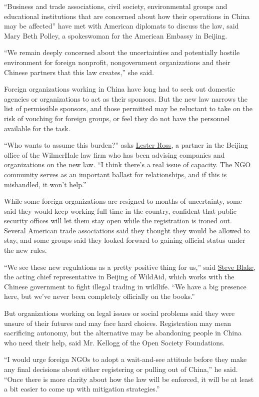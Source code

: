 ``Business and trade associations, civil society, environmental groups
and educational institutions that are concerned about how their
operations in China may be affected'' have met with American diplomats
to discuss the law, said Mary Beth Polley, a spokeswoman for the
American Embassy in Beijing.

``We remain deeply concerned about the uncertainties and potentially
hostile environment for foreign nonprofit, nongovernment organizations
and their Chinese partners that this law creates,'' she said.

Foreign organizations working in China have long had to seek out
domestic agencies or organizations to act as their sponsors. But the new
law narrows the list of permissible sponsors, and those permitted may be
reluctant to take on the risk of vouching for foreign groups, or feel
they do not have the personnel available for the task.

``Who wants to assume this burden?'' asks
\href{https://www.wilmerhale.com/lester_ross/}{Lester Ross}, a partner
in the Beijing office of the WilmerHale law firm who has been advising
companies and organizations on the new law. ``I think there's a real
issue of capacity. The NGO community serves as an important ballast for
relationships, and if this is mishandled, it won't help.''

While some foreign organizations are resigned to months of uncertainty,
some said they would keep working full time in the country, confident
that public security offices will let them stay open while the
registration is ironed out. Several American trade associations said
they thought they would be allowed to stay, and some groups said they
looked forward to gaining official status under the new rules.

``We see these new regulations as a pretty positive thing for us,'' said
\href{http://wildaid.org/people/steve-blake}{Steve Blake}, the acting
chief representative in Beijing of WildAid, which works with the Chinese
government to fight illegal trading in wildlife. ``We have a big
presence here, but we've never been completely officially on the
books.''

But organizations working on legal issues or social problems said they
were unsure of their futures and may face hard choices. Registration may
mean sacrificing autonomy, but the alternative may be abandoning people
in China who need their help, said Mr. Kellogg of the Open Society
Foundations.

``I would urge foreign NGOs to adopt a wait-and-see attitude before they
make any final decisions about either registering or pulling out of
China,'' he said. ``Once there is more clarity about how the law will be
enforced, it will be at least a bit easier to come up with mitigation
strategies.''

